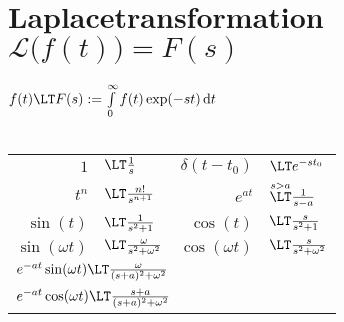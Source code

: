 \documentclass[german]{latex4ei/latex4ei_sheet}
\renewcommand{\diff}{\mathop{}\!\mathrm{\vphantom( d}}
\begin{document}
\section{Laplacetransformation \quad $\mathcal L\bigl(f(t)\bigr) = F(s)$}
\begin{sectionbox}
	$f(t) \LT F(s) := \int\limits_0^\infty f(t) \exp(-st) \diff t$\\
	\\
	\everymath{\displaystyle}	%
	\begin{tabular}{rl|rl}
		$1$ & \!\!\!\!\!\!\!\!\!\!$\LT \frac{1}{s}$ & $\delta(t-t_0)$ & \!\!\!\!\!\!\!\!\!\!$\LT e^{-s t_0}$\\[0.2em]
		$t^n$ & \!\!\!\!\!\!\!\!\!\!$\LT \frac{n!}{s^{n+1}}$ & $e^{at}$  & \!\!\!\!\!\!\!\!\!\!$\overset{s > a}{ \LT } \frac{1}{s-a}$\\[0.5em] 
		$\sin(t)$ & \!\!\!\!\!\!\!\!\!\!$\LT \frac{1}{s^2 + 1}$ & $\cos(t)$ & \!\!\!\!\!\!\!\!\!\!$\LT \frac{s}{s^2 + 1}$\\[0.5em]
		$\sin(\omega t)$ & \!\!\!\!\!\!\!\!\!\!$\LT \frac{\omega}{s^2 + \omega^2}$ & $\cos(\omega t)$ & \!\!\!\!\!\!\!\!\!\!$\LT \frac{s}{s^2 + \omega^2}$\\[0.5em]
		\multicolumn{4}{l}{ $e^{-at} \sin(\omega t) \LT \frac{\omega}{(s+a)^2+\omega^2}$} \\
		\multicolumn{4}{l}{ $e^{-at} \cos(\omega t) \LT \frac{s+a}{(s+a)^2+\omega^2}$}\\ 		


\end{tabular}
\end{sectionbox}
\end{document}
